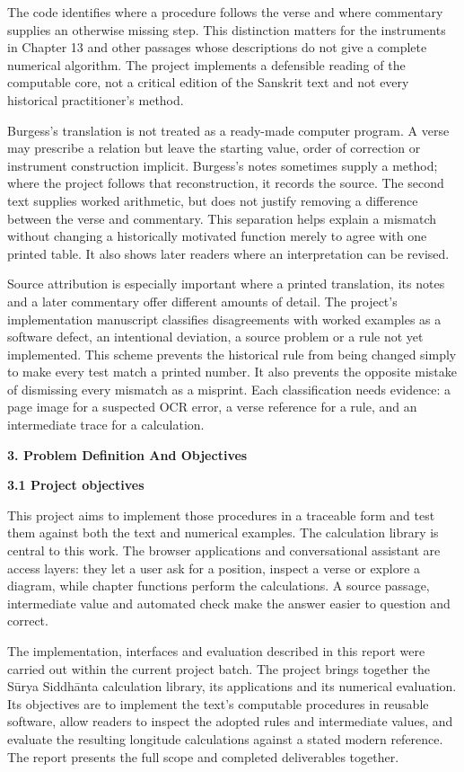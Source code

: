 \documentclass[
]{article}
\begin{document}
The code identifies where a procedure follows the verse and where
commentary supplies an otherwise missing step. This distinction matters
for the instruments in Chapter 13 and other passages whose descriptions
do not give a complete numerical algorithm. The project implements a
defensible reading of the computable core, not a critical edition of the
Sanskrit text and not every historical practitioner's method.

Burgess's translation is not treated as a ready-made computer program. A
verse may prescribe a relation but leave the starting value, order of
correction or instrument construction implicit. Burgess's notes
sometimes supply a method; where the project follows that
reconstruction, it records the source. The second text supplies worked
arithmetic, but does not justify removing a difference between the verse
and commentary. This separation helps explain a mismatch without
changing a historically motivated function merely to agree with one
printed table. It also shows later readers where an interpretation can
be revised.

Source attribution is especially important where a printed translation,
its notes and a later commentary offer different amounts of detail. The
project's implementation manuscript classifies disagreements with worked
examples as a software defect, an intentional deviation, a source
problem or a rule not yet implemented. This scheme prevents the
historical rule from being changed simply to make every test match a
printed number. It also prevents the opposite mistake of dismissing
every mismatch as a misprint. Each classification needs evidence: a page
image for a suspected OCR error, a verse reference for a rule, and an
intermediate trace for a calculation.

\textbf{3. Problem Definition And Objectives}

\textbf{3.1 Project objectives}

This project aims to implement those procedures in a traceable form and
test them against both the text and numerical examples. The calculation
library is central to this work. The browser applications and
conversational assistant are access layers: they let a user ask for a
position, inspect a verse or explore a diagram, while chapter functions
perform the calculations. A source passage, intermediate value and
automated check make the answer easier to question and correct.

The implementation, interfaces and evaluation described in this report
were carried out within the current project batch. The project brings
together the Sūrya Siddhānta calculation library, its applications and
its numerical evaluation. Its objectives are to implement the text's
computable procedures in reusable software, allow readers to inspect the
adopted rules and intermediate values, and evaluate the resulting
longitude calculations against a stated modern reference. The report
presents the full scope and completed deliverables together.
\end{document}

